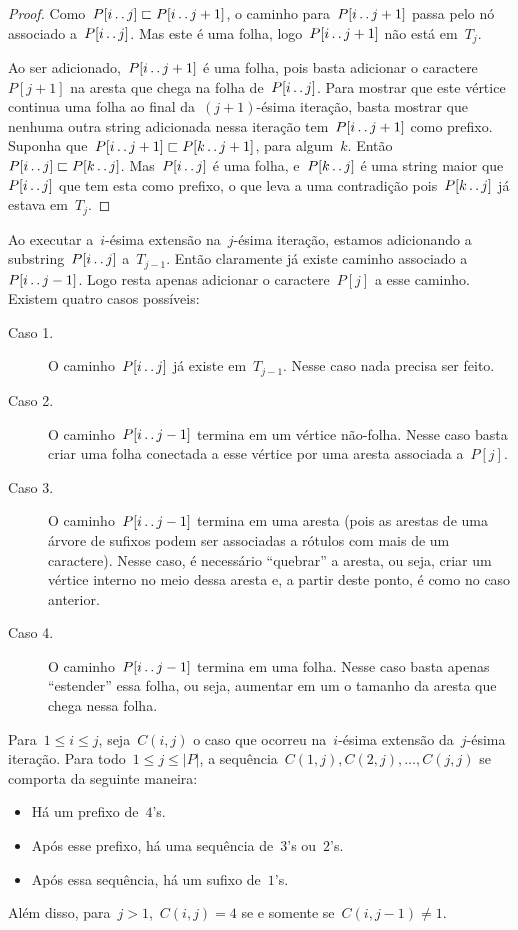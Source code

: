 \begin{proof}
Como~$P[i\,.\,.\, j] \sqsubset P[i\,.\,.\, j+1]$, o caminho para~$P[i\,.\,.\, j+1]$ passa pelo nó associado a~$P[i\,.\,.\, j]$. Mas este é uma folha, logo~$P[i\,.\,.\, j + 1]$ não está em~$T_j$.

Ao ser adicionado,~$P[i\,.\,.\, j+1]$ é uma folha, pois basta adicionar o caractere~$P[j+1]$ na aresta que chega na folha de~$P[i\,.\,.\, j]$. Para mostrar que este vértice continua uma folha ao final da~$(j+1)$-ésima iteração, basta mostrar que nenhuma outra string adicionada nessa iteração tem~$P[i\,.\,.\, j+1]$ como prefixo. Suponha que~$P[i\,.\,.\, j+1] \sqsubset P[k\,.\,.\, j+1]$, para algum~$k$. Então~$P[i\,.\,.\, j] \sqsubset P[k\,.\,.\, j]$. Mas~$P[i\,.\,.\, j]$ é uma folha, e~$P[k\,.\,.\, j]$ é uma string maior que~$P[i\,.\,.\, j]$ que tem esta como prefixo, o que leva a uma contradição pois~$P[k\,.\,.\, j]$ já estava em~$T_j$.
\end{proof}

Ao executar a~$i$-ésima extensão na~$j$-ésima iteração, estamos adicionando a substring~$P[i\,.\,.\, j]$ a~$T_{j-1}$. Então claramente já existe caminho associado a~$P[i\,.\,.\, j-1]$. Logo resta apenas adicionar o caractere~$P[j]$ a esse caminho. Existem quatro casos possíveis:

\begin{description}
    \item [Caso 1.] O caminho~$P[i\,.\,.\, j]$ já existe em~$T_{j-1}$. Nesse caso nada precisa ser feito.
    \item [Caso 2.] O caminho~$P[i\,.\,.\, j-1]$ termina em um vértice não-folha. Nesse caso basta criar uma folha conectada a esse vértice por uma aresta associada a~$P[j]$.
    \item [Caso 3.] O caminho~$P[i\,.\,.\, j-1]$ termina em uma aresta (pois as arestas de uma árvore de sufixos podem ser associadas a rótulos com mais de um caractere). Nesse caso, é necessário ``quebrar'' a aresta, ou seja, criar um vértice interno no meio dessa aresta e, a partir deste ponto, é como no caso anterior.
    \item [Caso 4.] O caminho~$P[i\,.\,.\, j-1]$ termina em uma folha. Nesse caso basta apenas ``estender'' essa folha, ou seja, aumentar em um o tamanho da aresta que chega nessa folha.
\end{description}

\begin{theorem}
\label{thm:estcasos}
Para~$1 \leq i \leq j$, seja~$C(i, j)$ o caso que ocorreu na~$i$-ésima extensão da~$j$-ésima iteração. Para todo~$1 \leq j \leq |P|$, a sequência~$C(1, j), C(2, j), \ldots, C(j, j)$ se comporta da seguinte maneira:
\begin{itemize}
    \item Há um prefixo de~$4$'s.
    \item Após esse prefixo, há uma sequência de~$3$'s ou~$2$'s.
    \item Após essa sequência, há um sufixo de~$1$'s.
\end{itemize}
Além disso, para~$j > 1$,~$C(i, j) = 4$ se e somente se~$C(i, j - 1) \neq 1$.
\end{theorem}


